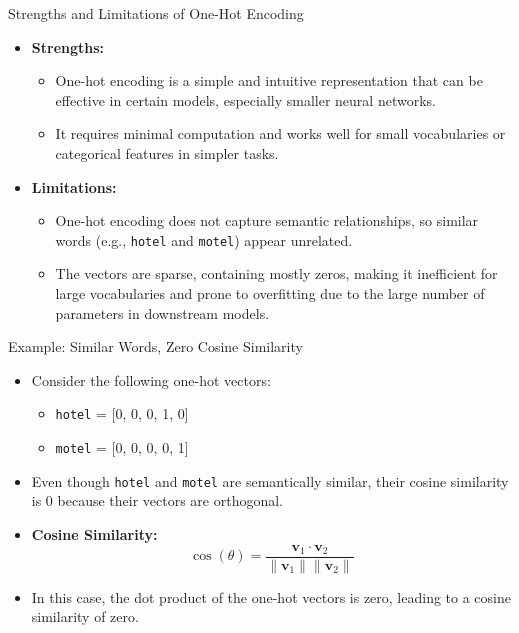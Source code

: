 \documentclass[serif, aspectratio=169]{beamer}
\begin{document}
\begin{frame}{Strengths and Limitations of One-Hot Encoding}
	\begin{itemize}
		\item \textbf{Strengths:}
		\begin{itemize}
			\item One-hot encoding is a simple and intuitive representation that can be effective in certain models, especially smaller neural networks.
			\item It requires minimal computation and works well for small vocabularies or categorical features in simpler tasks.
		\end{itemize}
		\item \textbf{Limitations:}
		\begin{itemize}
			\item One-hot encoding does not capture semantic relationships, so similar words (e.g., \texttt{hotel} and \texttt{motel}) appear unrelated.
			\item The vectors are sparse, containing mostly zeros, making it inefficient for large vocabularies and prone to overfitting due to the large number of parameters in downstream models.
		\end{itemize}
	\end{itemize}
\end{frame}

\begin{frame}{Example: Similar Words, Zero Cosine Similarity}
	\begin{itemize}
		\item Consider the following one-hot vectors:
		\begin{itemize}
			\item \texttt{hotel} = [0, 0, 0, 1, 0]
			\item \texttt{motel} = [0, 0, 0, 0, 1]
		\end{itemize}
		\item Even though \texttt{hotel} and \texttt{motel} are semantically similar, their cosine similarity is 0 because their vectors are orthogonal.
		\item \textbf{Cosine Similarity:}
		\[
		\cos(\theta) = \frac{\mathbf{v}_1 \cdot \mathbf{v}_2}{\|\mathbf{v}_1\| \|\mathbf{v}_2\|}
		\]
		\item In this case, the dot product of the one-hot vectors is zero, leading to a cosine similarity of zero.
	\end{itemize}
\end{frame}
\end{document}
